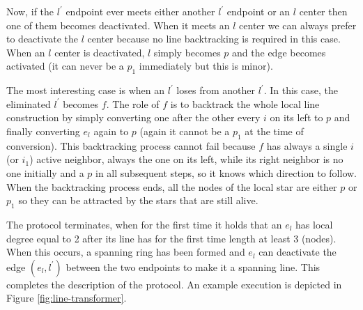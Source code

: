 \documentclass[preprint]{elsarticle}
\begin{document}
Now, if the $l^\prime$ endpoint ever meets either another $l^\prime$ endpoint or an $l$
center then one of them becomes deactivated. When it meets an $l$ center we
can always prefer to deactivate the $l$ center because no line backtracking
is required in this case. When an $l$ center is deactivated, $l$ simply
becomes $p$ and the edge becomes activated (it can never be a $p_1$
immediately but this is minor).

The most interesting case is when an $l^\prime$ loses from another $l^\prime$. In this
case, the eliminated $l^\prime$ becomes $f$. The role of $f$ is to backtrack the whole
local line construction by simply converting one after the other every $i$
on its left to $p$ and finally converting $e_l$ again to $p$ (again it
cannot be a $p_1$ at the time of conversion). This backtracking process
cannot fail because $f$ has always a single $i$ (or $i_1$) active neighbor,
always the one on its left, while its right neighbor is no one initially
and a $p$ in all subsequent steps, so it knows which direction to follow.
When the backtracking process ends, all the nodes of the local star are
either $p$ or $p_1$ so they can be attracted by the stars that are still alive.

The protocol terminates, when for the first time it holds that an $e_l$ has
local degree equal to 2 after its line has for the first time length at least 3 (nodes).
When this occurs, a spanning ring has been formed and $e_l$ can deactivate
the edge $(e_l,l^\prime)$ between the two endpoints to make it a spanning line. This completes the description of the protocol. An example execution is depicted in Figure \ref{fig:line-transformer}.
\end{document}
